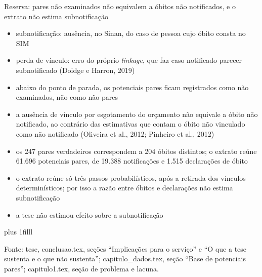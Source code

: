 \documentclass[aspectratio=169,11pt]{beamer}
\let\ressalvatexto\relax
\newcommand{\fontealign}{\raggedright}
\newcommand{\fonte}[2][tese, ]{\par\vskip 0pt plus 1filll
  \ifx\ressalvatexto\relax\else{\raggedright\footnotesize\color{black!70}\textit{Ressalva:} \ressalvatexto\par}\vskip 3pt\fi
  {\fontealign\tiny\color{black!65}Fonte: #1#2.\par}\vskip 3pt\global\let\ressalvatexto\relax}
\newcommand{\itens}[1]{\begin{itemize}#1\end{itemize}}
\begin{document}
\begin{frame}[label=R04]{Reserva: pares não examinados não equivalem a óbitos não notificados, e o extrato não estima subnotificação}
\footnotesize
\itens{\item subnotificação: ausência, no Sinan, do caso de pessoa cujo óbito consta no SIM
\item perda de vínculo: erro do próprio \textit{linkage}, que faz caso notificado parecer subnotificado (Doidge e Harron, 2019)
\item abaixo do ponto de parada, os potenciais pares ficam registrados como não examinados, não como não pares
\item a ausência de vínculo por esgotamento do orçamento não equivale a óbito não notificado, ao contrário das estimativas que contam o óbito não vinculado como não notificado (Oliveira et al., 2012; Pinheiro et al., 2012)
\item os 247 pares verdadeiros correspondem a 204 óbitos distintos; o extrato reúne 61.696 potenciais pares, de 19.388 notificações e 1.515 declarações de óbito
\item o extrato reúne só três passos probabilísticos, após a retirada dos vínculos determinísticos; por isso a razão entre óbitos e declarações não estima subnotificação
\item a tese não estimou efeito sobre a subnotificação}
\fonte{conclusao.tex, seções ``Implicações para o serviço'' e ``O que a tese sustenta e o que não sustenta''; capitulo\_dados.tex, seção ``Base de potenciais pares''; capitulo1.tex, seção de problema e lacuna}
\end{frame}
\end{document}
